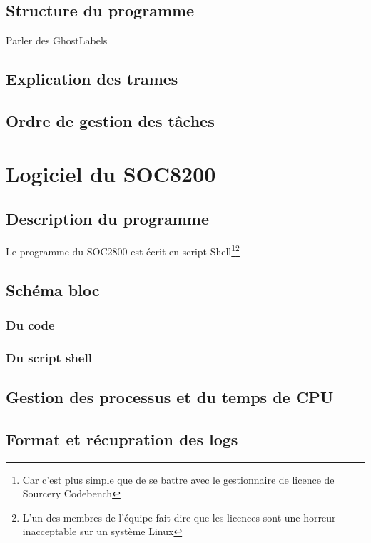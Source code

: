 \documentclass[10pt,a4paper,final]{article}
\begin{document}
\begin{spacing}{1.5}
\subsection{Structure du programme}
Parler des GhostLabels

\subsection{Explication des trames}

\subsection{Ordre de gestion des tâches}





\pagebreak
\section{Logiciel du SOC8200}
\subsection{Description du programme}
Le programme du SOC2800 est écrit en script Shell\footnote{Car c'est plus simple que de se battre avec le gestionnaire de licence de Sourcery Codebench}\footnote{L'un des membres de l'équipe fait dire que les licences sont une horreur inacceptable sur un système Linux}

\subsection{Schéma bloc}
\subsubsection{Du code}

\subsubsection{Du script shell}

\subsection{Gestion des processus et du temps de CPU}

\subsection{Format et récupration des logs}


\end{spacing}
\end{document}
